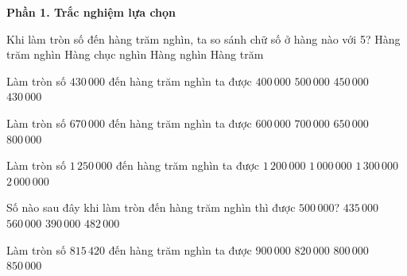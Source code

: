 \textbf{Phần 1. Trắc nghiệm lựa chọn}

\begin{ex} %
Khi làm tròn số đến hàng trăm nghìn, ta so sánh chữ số ở hàng nào với 5?
\choice
{Hàng trăm nghìn}
{\True Hàng chục nghìn}
{Hàng nghìn}
{Hàng trăm}
\end{ex}

\begin{ex} %
Làm tròn số $430\,000$ đến hàng trăm nghìn ta được
\choice
{\True $400\,000$}
{$500\,000$}
{$450\,000$}
{$430\,000$}
\end{ex}

\begin{ex} %
Làm tròn số $670\,000$ đến hàng trăm nghìn ta được
\choice
{$600\,000$}
{\True $700\,000$}
{$650\,000$}
{$800\,000$}
\end{ex}

\begin{ex} %
Làm tròn số $1\,250\,000$ đến hàng trăm nghìn ta được
\choice
{$1\,200\,000$}
{$1\,000\,000$}
{\True $1\,300\,000$}
{$2\,000\,000$}
\end{ex}

\begin{ex} %
Số nào sau đây khi làm tròn đến hàng trăm nghìn thì được $500\,000$?
\choice
{$435\,000$}
{$560\,000$}
{$390\,000$}
{\True $482\,000$}
\end{ex}

\begin{ex} %
Làm tròn số $815\,420$ đến hàng trăm nghìn ta được
\choice
{$900\,000$}
{$820\,000$}
{\True $800\,000$}
{$850\,000$}
\end{ex}

